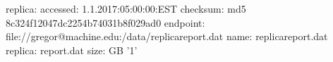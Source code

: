 replica:
  accessed: 1.1.2017:05:00:00:EST
  checksum:
  \- md5
  \- 8c324f12047dc2254b74031b8f029ad0
  endpoint: file://gregor@machine.edu:/data/replicareport.dat
  name: replicareport.dat
  replica: report.dat
  size:
  \- GB
  \- '1'
